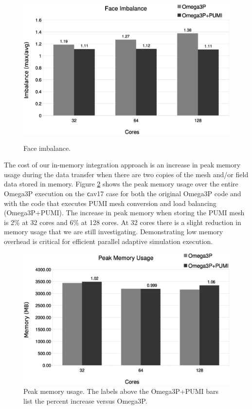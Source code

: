 \documentclass[a4paper]{article}
\begin{document}
\begin{figure}[ht]
\centering
  \includegraphics[width=\textwidth]{face-imb.eps} \\
  \caption{\label{fig:elm} Face imbalance.}
\end{figure}

The cost of our in-memory integration approach is an increase in peak memory
usage during the data transfer when there are two copies of the mesh and/or
field data stored in memory.
Figure \ref{fig:memusage} shows the peak memory usage over the entire Omega3P
execution on the {\texttt cav17} case for both the original Omega3P code and
with the code that executes PUMI mesh conversion and load balancing
(Omega3P+PUMI).
The increase in peak memory when storing the PUMI mesh is 2\% at 32 cores and
6\% at 128 cores.
At 32 cores there is a slight reduction in memory usage that we are still
investigating.
Demonstrating low memory overhead is critical for efficient parallel adaptive
simulation execution.

\begin{figure}[ht]
\centering
  \includegraphics[width=\textwidth]{peak-memory-usage.eps}
  \caption{\label{fig:memusage} Peak memory usage. The labels above the Omega3P+PUMI bars
  list the percent increase versus Omega3P.}
\end{figure}
\end{document}
